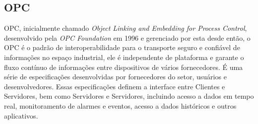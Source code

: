         
        \begin{figure}[!h]
	    \end{figure}
	    
        \begin{table}[h!]	
        	\centering
        \end{table}

        
    \subsection{OPC}
    \label{sec:opc}
    
        \gls{OPC}, inicialmente chamado \textit{Object Linking and Embedding for Process Control}, desenvolvido pela \textit{OPC Foundation} em 1996 e gerenciado por esta desde então, o \gls{OPC} é o padrão de interoperabilidade para o transporte seguro e confiável de informações no espaço industrial, ele é independente de plataforma e garante o fluxo contínuo de informações entre dispositivos de vários fornecedores. É uma série de especificações desenvolvidas por fornecedores do setor, usuários e desenvolvedores. Essas especificações definem a interface entre Clientes e Servidores, bem como Servidores e Servidores, incluindo acesso a dados em tempo real, monitoramento de alarmes e eventos, acesso a dados históricos e outros aplicativos. \cite{OPC}
        

